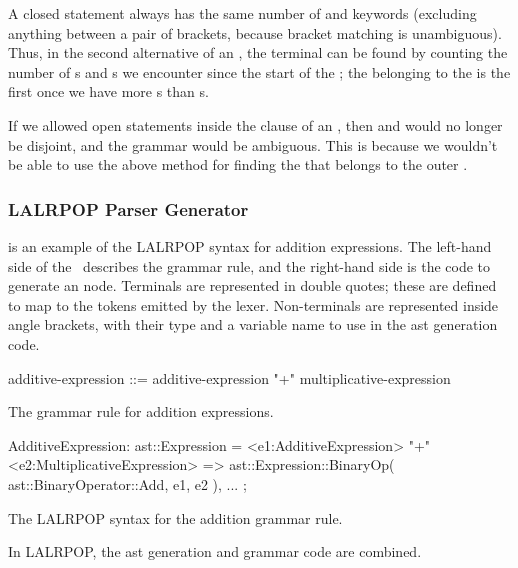 \documentclass[00-main.tex]{subfiles}
\begin{document}
A closed statement always has the same number of  and  keywords (excluding anything between a pair of brackets, because bracket matching is unambiguous).
Thus, in the second alternative of an , the  terminal can be found by counting the number of s and s we encounter since the start of the ; the  belonging to the  is the first  once we have more s than s.

If we allowed open statements inside the  clause of an , then  and  would no longer be disjoint, and the grammar would be ambiguous. This is because we wouldn't be able to use the above method for finding the  that belongs to the outer .

\subsubsection{LALRPOP Parser Generator}

 is an example of the LALRPOP syntax for addition expressions.
The left-hand side of the~\RustInline{=>} describes the grammar rule, and the right-hand side is the code to generate an  node.
Terminals are represented in double quotes; these are defined to map to the tokens emitted by the lexer.
Non-terminals are represented inside angle brackets, with their type and a variable name to use in the \gls{ast} generation code.

\begin{listing}[t]
  \begin{sublisting}[t]{\textwidth}
    \begin{GrammarListing}
      additive-expression ::= additive-expression "+" multiplicative-expression
    \end{GrammarListing}
    \caption{The grammar rule for addition expressions.}
  \end{sublisting}
  \par\medskip %
  \begin{sublisting}[t]{\textwidth}
    \begin{RustListing}
      AdditiveExpression: ast::Expression = {
          <e1:AdditiveExpression> "+" <e2:MultiplicativeExpression>
              => ast::Expression::BinaryOp(
                  ast::BinaryOperator::Add,
                  e1,
                  e2
              ),
          ...
      };
    \end{RustListing}
    \caption{The LALRPOP syntax for the addition grammar rule.}
  \end{sublisting}
  \caption{In LALRPOP, the \gls{ast} generation and grammar code are combined.}
  \label{lst:AST generation code example}
\end{listing}
\end{document}
